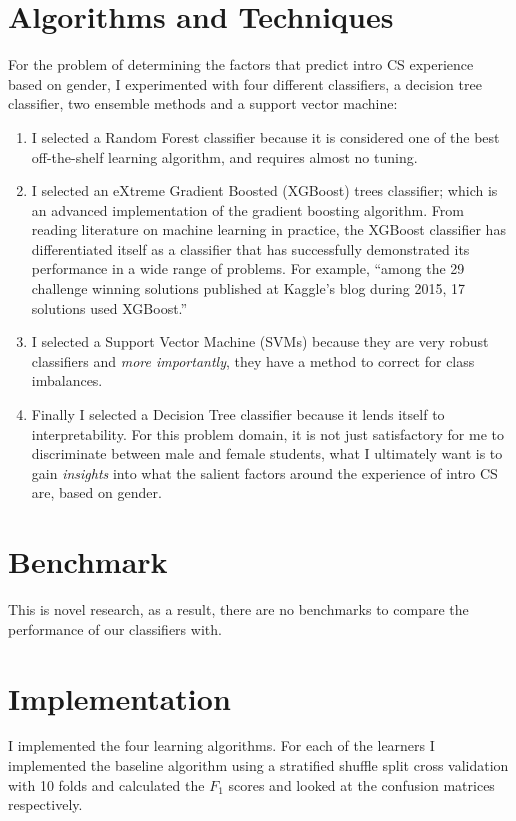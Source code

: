 \section*{Algorithms and Techniques}

For the problem of determining the factors that predict intro CS experience based on gender, I experimented with four different classifiers, a decision tree classifier, two ensemble methods and a support vector machine:

\begin{enumerate}%
\item I selected a Random Forest classifier because it is considered one of the best off-the-shelf learning algorithm, and requires almost no tuning. 

\item I selected an eXtreme Gradient Boosted (XGBoost) trees classifier; which is an advanced implementation of the gradient boosting algorithm. From reading literature on machine learning in practice, the XGBoost classifier has differentiated itself as a classifier that has successfully demonstrated its performance in a wide range of problems. For example, ``among the 29 challenge winning solutions published at Kaggle's blog during 2015, 17 solutions used XGBoost.''

\item I selected a Support Vector Machine (SVMs) because they are very robust classifiers and \textit{more importantly}, they have a method to correct for class imbalances. 
              
\item Finally I selected a Decision Tree classifier because it lends itself to interpretability. For this problem domain, it is not just satisfactory for me to discriminate between male and female students, what I ultimately want is to gain \textit{insights} into what the salient factors around the experience of intro CS are, based on gender.

\end{enumerate}

\section*{Benchmark}

This is novel research, as a result, there are no benchmarks to compare the performance of our classifiers with.

\section*{Implementation}
I implemented the four learning algorithms. For each of the learners I implemented the baseline algorithm using a stratified shuffle split cross validation with 10 folds and calculated the $F_1$ scores and looked at the confusion matrices respectively. 



